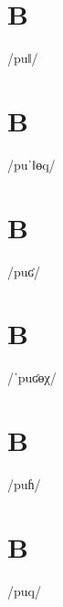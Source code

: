 \documentclass[10pt,a4paper,twoside]{book}
\begin{document}
\section*{B}

\begin{multicols}{3}
 {/puǁ/} {}
\end{multicols}

\section*{B}

\begin{multicols}{3}
 {/puˈǁɵq/} {}
\end{multicols}

\section*{B}

\begin{multicols}{3}
 {/puʛ/} {}
\end{multicols}

\section*{B}

\begin{multicols}{3}
 {/ˈpuʛɵχ/} {}
\end{multicols}

\section*{B}

\begin{multicols}{3}
 {/puɦ/} {}
\end{multicols}

\section*{B}

\begin{multicols}{3}
 {/puq/} {}
\end{multicols}
\end{document}
